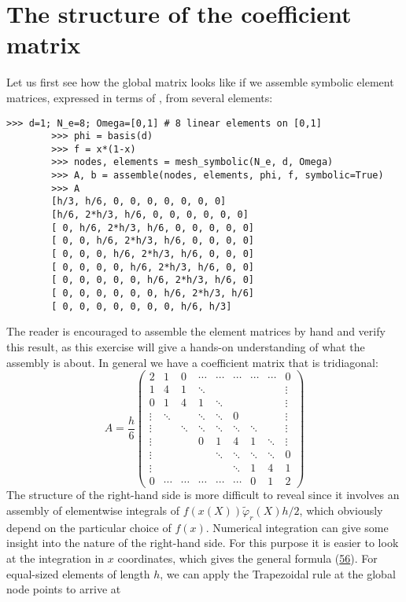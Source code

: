 \documentclass[../main.tex]{subfiles}
\begin{document}
	\section[The structure of the coefficient matrix]{The structure of the coefficient matrix}
	\label{sec:sec_4_6}
	\noindent Let us first see how the global matrix looks like if we assemble symbolic element
	matrices, expressed in terms of , from several elements:
	\begin{lstlisting}[numbers=none]
		>>> d=1; N_e=8; Omega=[0,1] # 8 linear elements on [0,1]
		>>> phi = basis(d)
		>>> f = x*(1-x)
		>>> nodes, elements = mesh_symbolic(N_e, d, Omega)
		>>> A, b = assemble(nodes, elements, phi, f, symbolic=True)
		>>> A
		[h/3, h/6, 0, 0, 0, 0, 0, 0, 0]
		[h/6, 2*h/3, h/6, 0, 0, 0, 0, 0, 0]
		[ 0, h/6, 2*h/3, h/6, 0, 0, 0, 0, 0]
		[ 0, 0, h/6, 2*h/3, h/6, 0, 0, 0, 0]
		[ 0, 0, 0, h/6, 2*h/3, h/6, 0, 0, 0]
		[ 0, 0, 0, 0, h/6, 2*h/3, h/6, 0, 0]
		[ 0, 0, 0, 0, 0, h/6, 2*h/3, h/6, 0]
		[ 0, 0, 0, 0, 0, 0, h/6, 2*h/3, h/6]
		[ 0, 0, 0, 0, 0, 0, 0, h/6, h/3]	
	\end{lstlisting}
	The reader is encouraged to assemble the element matrices by hand and verify
	this result, as this exercise will give a hands-on understanding of what the
	assembly is about. In general we have a coefficient matrix that is tridiagonal:
	\begin{equation}\label{eqa79}
		A=\frac{h}{6}\left(\begin{array}{ccccccccc}
			2 & 1 & 0 & \cdots & \cdots & \cdots & \cdots & \cdots & 0 \\
			1 & 4 & 1 & \ddots & & & & & \vdots \\
			0 & 1 & 4 & 1 & \ddots & & & & \vdots \\
			\vdots & \ddots & & \ddots & \ddots & 0 & & & \vdots \\
			\vdots & & \ddots & \ddots & \ddots & \ddots & \ddots & & \vdots \\
			\vdots & & & 0 & 1 & 4 & 1 & \ddots & \vdots \\
			\vdots & & & & \ddots & \ddots & \ddots & \ddots & 0 \\
			\vdots & & & & & \ddots & 1 & 4 & 1 \\
			0 & \cdots & \cdots & \cdots & \cdots & \cdots & 0 & 1 & 2
		\end{array}\right)
	\end{equation}
	\bigbreak
	The structure of the right-hand side is more difficult to reveal since it involves an assembly of elementwise integrals of $f(x(X)) \tilde{\varphi}_{r}(X) h / 2$, which obviously depend on the particular choice of $f(x)$. Numerical integration can give some insight into the nature of the right-hand side. For this purpose it is easier to look at the integration in $x$ coordinates, which gives the general formula (\hyperref[eqa56]{56}). For equal-sized elements of length $h$, we can apply the Trapezoidal rule at the global node points to arrive at
\end{document}
